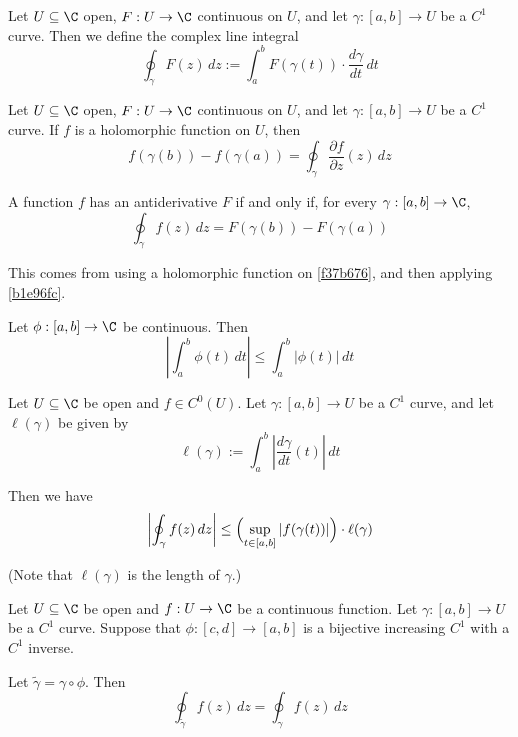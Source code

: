 Let $U\subseteq\C$ open, $F:U\to\C$ continuous on $U$, and let $\gamma:[a,b]\to
U$ be a $C^1$ curve. Then we define the complex line integral
$$
  \oint_\gamma F(z)\,dz:=\int_a^bF(\gamma(t))\cdot\frac{d\gamma}{dt}\,dt
$$

\label{c526c09}

Let $U\subseteq\C$ open, $F:U\to\C$ continuous on $U$, and let $\gamma:[a,b]\to
U$ be a $C^1$ curve. If $f$ is a holomorphic function on $U$, then
$$
  f(\gamma(b))-f(\gamma(a))=\oint_\gamma\frac{\partial f}{\partial z}(z)\,dz
$$

\label{cf21af2}

A function $f$ has an antiderivative $F$ if and only if, for every
$\gamma:[a,b]\to\C$,
$$
  \oint_\gamma f(z)\,dz=F(\gamma(b))-F(\gamma(a))
$$

This comes from using a holomorphic function on \autoref{f37b676}, and then
applying \autoref{b1e96fc}.

\label{bcec8b1}

Let $\phi:[a,b]\to\C$ be continuous. Then
$$
  \left|\int_a^b\phi(t)\,dt\right|\leq\int_a^b|\phi(t)|\,dt
$$

\label{faf3f86}

Let $U\subseteq\C$ be open and $f\in C^0(U)$. Let $\gamma:[a,b]\to U$ be a
$C^1$ curve, and let $\ell(\gamma)$ be given by
$$
  \ell(\gamma):=\int_a^b\left|\frac{d\gamma}{dt}(t)\right|\,dt
$$

Then we have
$$
  \left|\oint_\gamma f(z)\,dz\right|\leq
  \Bigl(\sup_{t\in[a,b]}|f(\gamma(t))|\Bigr)\cdot\ell(\gamma)
$$

(Note that $\ell(\gamma)$ is the length of $\gamma$.)

\label{f74efcb}

Let $U\subseteq\C$ be open and $f:U\to\C$ be a continuous function. Let
$\gamma:[a,b]\to U$ be a $C^1$ curve. Suppose that $\phi:[c,d]\to[a,b]$ is a
bijective increasing $C^1$ with a $C^1$ inverse.


Let $\tilde\gamma=\gamma\circ\phi$. Then
$$
  \oint_{\tilde\gamma}f(z)\,dz=\oint_\gamma f(z)\,dz
$$

